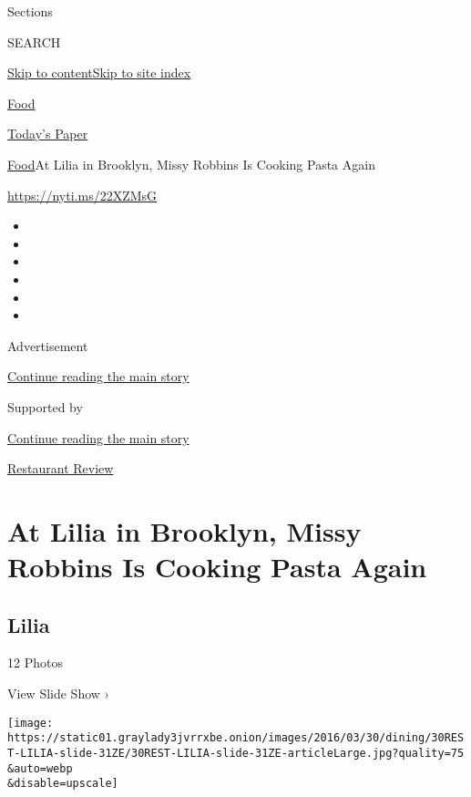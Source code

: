 Sections

SEARCH

\protect\hyperlink{site-content}{Skip to
content}\protect\hyperlink{site-index}{Skip to site index}

\href{https://www.nytimes3xbfgragh.onion/section/food}{Food}

\href{https://myaccount.nytimes3xbfgragh.onion/auth/login?response_type=cookie\&client_id=vi}{}

\href{https://www.nytimes3xbfgragh.onion/section/todayspaper}{Today's
Paper}

\href{/section/food}{Food}\textbar{}At Lilia in Brooklyn, Missy Robbins
Is Cooking Pasta Again

\url{https://nyti.ms/22XZMsG}

\begin{itemize}
\item
\item
\item
\item
\item
\item
\end{itemize}

Advertisement

\protect\hyperlink{after-top}{Continue reading the main story}

Supported by

\protect\hyperlink{after-sponsor}{Continue reading the main story}

\href{/column/restaurant-review}{Restaurant Review}

\hypertarget{at-lilia-in-brooklyn-missy-robbins-is-cooking-pasta-again}{%
\section{At Lilia in Brooklyn, Missy Robbins Is Cooking Pasta
Again}\label{at-lilia-in-brooklyn-missy-robbins-is-cooking-pasta-again}}

\href{https://www.nytimes3xbfgragh.onion/slideshow/2016/03/30/dining/lilia-restaurant-brooklyn.html}{}

\hypertarget{lilia}{%
\subsection{Lilia}\label{lilia}}

12 Photos

View Slide Show ›

\texttt{[image: https://static01.graylady3jvrrxbe.onion/images/2016/03/30/dining/30REST-LILIA-slide-31ZE/30REST-LILIA-slide-31ZE-articleLarge.jpg?quality=75\\\&auto=webp\\\&disable=upscale]}

